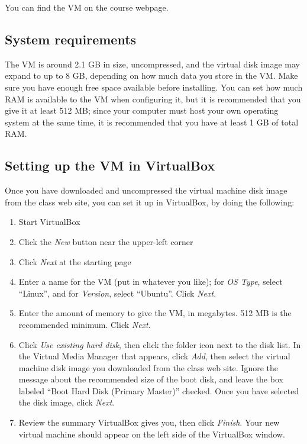 \documentclass[letterpaper,10pt,english]{sphinxmanual}
\begin{document}
You can find the VM on the course webpage.


\subsection{System requirements}
\label{vm:system-requirements}
The VM is around 2.1 GB in size, uncompressed, and the virtual disk
image may expand to up to 8 GB, depending on how much data you store
in the VM.  Make sure you have enough free space available before
installing.  You can set how much RAM is available to the VM when
configuring it, but it is recommended that you give it at least 512
MB; since your computer must host your own operating system at the
same time, it is recommended that you have at least 1 GB of total RAM.


\subsection{Setting up the VM in VirtualBox}
\label{vm:setting-up-the-vm-in-virtualbox}
Once you have downloaded and uncompressed the virtual machine disk
image from the class web site, you can set it up in VirtualBox, by
doing the following:
\begin{enumerate}
\item {} 
Start VirtualBox

\item {} 
Click the \emph{New} button near the upper-left corner

\item {} 
Click \emph{Next} at the starting page

\item {} 
Enter a name for the VM (put in whatever you like); for \emph{OS Type},
select ``Linux'', and for \emph{Version}, select ``Ubuntu''.  Click \emph{Next}.

\item {} 
Enter the amount of memory to give the VM, in megabytes.
512 MB is the recommended minimum.  Click \emph{Next}.

\item {} 
Click \emph{Use existing hard disk}, then click the folder icon next to
the disk list.  In the Virtual Media Manager that appears, click
\emph{Add}, then select the virtual machine disk image you downloaded
from the class web site.  Ignore the message about the recommended
size of the boot disk, and leave the box labeled ``Boot Hard Disk
(Primary Master)'' checked.  Once you have selected the disk image,
click \emph{Next}.

\item {} 
Review the summary VirtualBox gives you, then click \emph{Finish}.  Your
new virtual machine should appear on the left side of the VirtualBox
window.

\end{enumerate}
\end{document}
